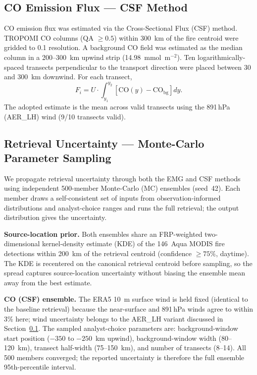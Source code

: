 \documentclass[draft]{agujournal2019}
\newcommand{\hPa}{\,hPa}
\begin{document}
\subsection{CO Emission Flux --- CSF Method}
\label{sec:csf}

CO emission flux was estimated via the Cross-Sectional Flux (CSF) method. TROPOMI CO columns (QA $\geq 0.5$) within 300~km of the fire centroid were gridded to 0.1\degree{} resolution. A background CO field was estimated as the median column in a 200--300~km upwind strip (14.98~mmol~m$^{-2}$). Ten logarithmically-spaced transects perpendicular to the transport direction were placed between 30 and 300~km downwind. For each transect,
\begin{equation}
  F_i = U \cdot \int_{y_1}^{y_2}
    \left[\mathrm{CO}(y) - \mathrm{CO}_\mathrm{bg}\right] dy .
  \label{eq:csf}
\end{equation}
The adopted estimate is the mean across valid transects using the 891\hPa{} (AER\_LH) wind (9/10 transects valid).

\subsection{Retrieval Uncertainty --- Monte-Carlo Parameter Sampling}
\label{sec:mc}

We propagate retrieval uncertainty through both the EMG and CSF methods using independent 500-member Monte-Carlo (MC) ensembles (seed~42). Each member draws a self-consistent set of inputs from observation-informed distributions and analyst-choice ranges and runs the full retrieval; the output distribution gives the uncertainty.

\textbf{Source-location prior.} Both ensembles share an FRP-weighted two-dimensional kernel-density estimate (KDE) of the 146~Aqua MODIS fire detections within 200~km of the retrieval centroid (confidence $\geq 75\%$, daytime). The KDE is recentered on the canonical retrieval centroid before sampling, so the spread captures source-location uncertainty without biasing the ensemble mean away from the best estimate.

\textbf{CO (CSF) ensemble.} The ERA5 10~m surface wind is held fixed (identical to the baseline retrieval) because the near-surface and 891\hPa{} winds agree to within 3\% here; wind uncertainty belongs to the AER\_LH variant discussed in Section~\ref{sec:csf}. The sampled analyst-choice parameters are: background-window start position ($-350$ to $-250$~km upwind), background-window width (80--120~km), transect half-width (75--150~km), and number of transects (8--14). All 500 members converged; the reported uncertainty is therefore the full ensemble 95th-percentile interval.
\end{document}

